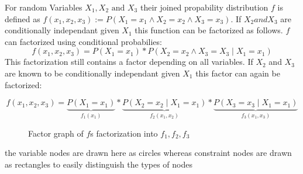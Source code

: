 \begin{example}
For random Variables $X_1, X_2 \text{ and } X_3$ their joined propability distribution $f$ is defined as $f(x_1, x_2, x_3) := P(X_1 = x_1 \land X_2  = x_2 \land X_3 = x_3)$. If $X_2 and X_3$ are conditionally independant given $X_1$ this function can be factorized as follows. $f$ can factorized using conditional probabilies: $$f(x_1, x_2, x_3) = P(X_1 = x_1) * P(X_2 = x_2 \land X_3 = X_3 \; | \; X_1 = x_1)$$
This factorization still contains a factor depending on all variables. If $X_2$ and $X_3$ are known to be conditionally independant given $X_1$ this factor can again be factorized:

$$f(x_1, x_2, x_3) = \underbrace{P(X_1 = x_1)}_{f_1(x_1)} * \underbrace{P(X_2 = x_2 \; | \; X_1 = x_1)}_{f_2(x_1, x_2)} * \underbrace{P(X_3 = x_3 \; | \; X_1 = x_1)}_{f_3(x_1, x_3)}$$

\begin{figure}
\centering

\caption{Factor graph of $f$s factorization into $f_1, f_2, f_3$}
\end{figure}

the variable nodes are drawn here as circles whereas constraint nodes are drawn as rectangles to easily distinguish the types of nodes

\end{example}
%


